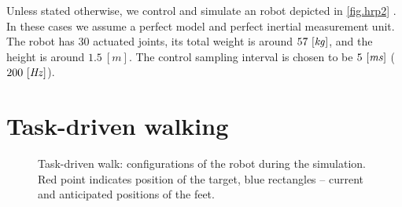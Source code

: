 Unless stated otherwise, we control and simulate an  robot depicted
in \cref{fig.hrp2} \cite{Kaneko2004icra}. In these cases we assume a perfect
model and perfect inertial measurement unit. The robot has $30$ actuated
joints, its total weight is around $57~[\mathit{kg}]$, and the height is around
$1.5~[m]$. The control sampling interval is chosen to be $5~[\mathit{ms}]$
($200~[\mathit{Hz}]$).



\section{Task-driven walking}\label{sec.task_walk}
\vspace{-1cm}
%
\begin{figure}[!htb]
    \begin{minipage}[t]{0.49\textwidth}
    \end{minipage}
    \hfill
    \begin{minipage}[t]{0.49\textwidth}
    \end{minipage}
    \begin{minipage}[t]{0.49\textwidth}
    \end{minipage}
    \hfill
    \begin{minipage}[t]{0.49\textwidth}
    \end{minipage}
    \begin{minipage}[t]{0.49\textwidth}
    \end{minipage}
    \hfill
    \begin{minipage}[t]{0.49\textwidth}
    \end{minipage}
    \caption[Task-driven walk: configurations of the robot during the simulation.]{
        Task-driven walk: configurations of the robot during the simulation.
        Red point indicates position of the target, blue rectangles -- current
        and anticipated positions of the feet.
    }
    \label{fig.task_walk}
\end{figure}
%

